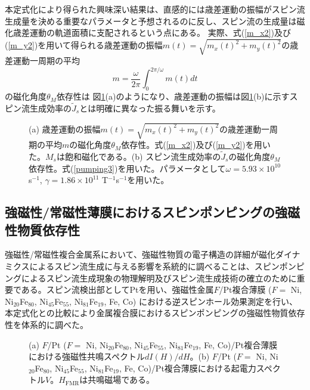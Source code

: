 本定式化により得られた興味深い結果は、直感的には歳差運動の振幅がスピン流生成量を決める重要なパラメータと予想されるのに反し、スピン流の生成量は磁化歳差運動の軌道面積に支配されるという点にある。
実際、式(\ref{m_x2})及び(\ref{m_y2})を用いて得られる歳差運動の振幅$m(t)=\sqrt{m_x(t)^2+m_y(t)^2}$の歳差運動一周期の平均
\begin{equation}
m=\frac{\omega}{2\pi}\int^{2\pi/\omega}_0 m(t) dt
\end{equation}
の磁化角度$\theta_M$依存性は
図\ref{precessionamplitude}(a)のようになり、歳差運動の振幅は図\ref{precessionamplitude}(b)に示すスピン流生成効率の$\tilde {J}_s$とは明確に異なった振る舞いを示す。






\begin{figure}[tbp]
\begin{center}
\caption{(a) 歳差運動の振幅$m(t)=\sqrt{m_x(t)^2+m_y(t)^2}$の歳差運動一周期の平均$m$の磁化角度$\theta_M$依存性。式(\ref{m_x2})及び(\ref{m_y2})を用いた。$M_s$は飽和磁化である。(b) スピン流生成効率の$\tilde {J}_s$の磁化角度$\theta_M$依存性。式(\ref{pumping3})を用いた。パラメータとして$\omega=5.93\times 10^{10}$ s$^{-1}$, $\gamma=1.86\times 10^{11}$ T$^{-1}$s$^{-1}$を用いた。
}
\label{precessionamplitude}
\end{center}
\end{figure}

\subsection{強磁性/常磁性薄膜におけるスピンポンピングの強磁性物質依存性}
強磁性/常磁性複合金属系において、強磁性物質の電子構造の詳細が磁化ダイナミクスによるスピン流生成に与える影響を系統的に調べることは、スピンポンピングによるスピン流生成現象の物理解明及びスピン流生成技術の確立のために重要である。スピン流検出部としてPtを用い、強磁性金属$F$/Pt複合薄膜 ($F=$ Ni, Ni$_{20}$Fe$_{80}$, Ni$_{45}$Fe$_{55}$, Ni$_{81}$Fe$_{19}$, Fe, Co) における逆スピンホール効果測定を行い、本定式化との比較により金属複合膜におけるスピンポンピングの強磁性物質依存性を体系的に調べた。


\begin{figure}[tbp]
\centerline{
}
\caption{(a) $F$/Pt ($F=$ Ni, Ni$_{20}$Fe$_{80}$, Ni$_{45}$Fe$_{55}$, Ni$_{81}$Fe$_{19}$, Fe, Co)/Pt複合薄膜における強磁性共鳴スペクトル$dI(H)/dH$。(b) $F$/Pt ($F=$ Ni, Ni$_{20}$Fe$_{80}$, Ni$_{45}$Fe$_{55}$, Ni$_{81}$Fe$_{19}$, Fe, Co)/Pt複合薄膜における起電力スペクトル$V$。$H_\text{FMR}$は共鳴磁場である。}
\label{ISHE_F} 
\end{figure}


